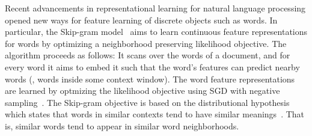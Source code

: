 
Recent advancements in representational learning for natural language processing opened new ways for feature learning of discrete objects such as words.
In particular, the Skip-gram model~\cite{word2vec} aims to learn continuous feature representations for words by optimizing a neighborhood preserving likelihood objective. 
The algorithm proceeds as follows: It scans over the words of a document, and for every word it aims to embed it such that the word's features can predict nearby words (\ie, words inside some context window). The word feature representations are learned by optmizing the likelihood objective using SGD with negative sampling~\cite{word2vec2}. 
%
The Skip-gram objective is based on the distributional hypothesis which states that words in similar contexts tend to have similar meanings~\cite{harris-1954}. That is, similar words tend to appear in similar word neighborhoods.

